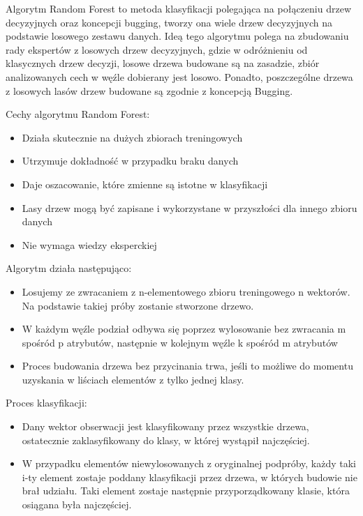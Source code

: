 \documentclass[brudnopis]{xmgr}
\begin{document}
Algorytm Random Forest\cite{3}\cite{13} to metoda klasyfikacji polegająca na połączeniu drzew decyzyjnych oraz koncepcji bugging, tworzy ona wiele drzew decyzyjnych na podstawie losowego zestawu danych. Ideą tego algorytmu polega na zbudowaniu rady ekspertów z losowych drzew decyzyjnych, gdzie w odróżnieniu od klasycznych drzew decyzji, losowe drzewa budowane są na zasadzie, zbiór analizowanych cech w węźle dobierany jest losowo. Ponadto, poszczególne drzewa z losowych lasów drzew budowane są zgodnie z koncepcją Bugging.

\newpage

Cechy algorytmu Random Forest:
\begin{itemize}
\item
Działa skutecznie na dużych zbiorach treningowych
\item
Utrzymuje dokładność w przypadku braku danych
\item
Daje oszacowanie, które zmienne są istotne w klasyfikacji
\item
Lasy drzew mogą być zapisane i wykorzystane w przyszłości dla innego zbioru danych
\item
Nie wymaga wiedzy eksperckiej
\end{itemize}

Algorytm działa następująco:
\begin{itemize}
\item
Losujemy ze zwracaniem z n-elementowego zbioru treningowego n wektorów. Na podstawie takiej próby zostanie stworzone drzewo.
\item
W każdym węźle podział odbywa się poprzez wylosowanie bez zwracania m spośród p atrybutów, następnie w kolejnym węźle k spośród m atrybutów
\item
Proces budowania drzewa bez przycinania trwa, jeśli to możliwe do momentu uzyskania w liściach elementów z tylko jednej klasy.
\end{itemize}

Proces klasyfikacji:
\begin{itemize}
\item
Dany wektor obserwacji jest klasyfikowany przez wszystkie drzewa, ostatecznie zaklasyfikowany do klasy, w której wystąpił najczęściej.
\item
W przypadku elementów niewylosowanych z oryginalnej podpróby, każdy taki i-ty element zostaje poddany klasyfikacji przez drzewa, w których budowie nie brał udziału. Taki element zostaje następnie przyporządkowany klasie, która osiągana była najczęściej.
\end{itemize}
\end{document}
